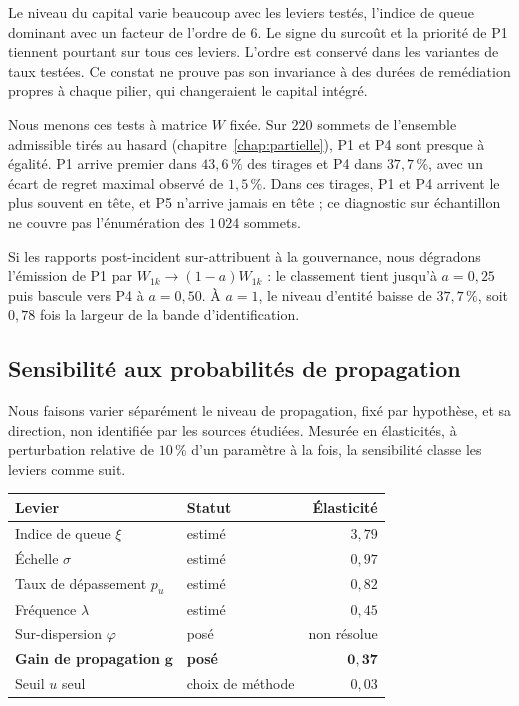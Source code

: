 Le niveau du capital varie beaucoup avec les leviers testés, l'indice de queue dominant avec
un facteur de l'ordre de $6$. Le signe du surcoût et la priorité de P1 tiennent pourtant sur tous
ces leviers. L'ordre est conservé dans les variantes de taux testées. Ce constat ne prouve pas son invariance
à des durées de remédiation propres à chaque pilier, qui changeraient le capital intégré.

Nous menons ces tests à matrice $W$ fixée. Sur $220$ sommets de l'ensemble admissible tirés au
hasard (chapitre~\ref{chap:partielle}), P1 et P4 sont presque à égalité. P1 arrive premier dans
$43{,}6\,\%$ des tirages et P4 dans $37{,}7\,\%$, avec un écart de regret maximal observé de
$1{,}5\,\%$. Dans ces tirages, P1 et P4 arrivent le plus souvent en tête, et P5 n'arrive jamais en tête ;
ce diagnostic sur échantillon ne couvre pas l'énumération des $1\,024$ sommets.

Si les rapports post-incident sur-attribuent à la gouvernance, nous
dégradons l'émission de P1 par $W_{1k}\to(1-a)W_{1k}$ : le classement tient jusqu'à $a=0{,}25$
puis bascule vers P4 à $a=0{,}50$. À $a=1$, le niveau d'entité baisse de $37{,}7\,\%$, soit
$0{,}78$ fois la largeur de la bande d'identification.

\subsection{Sensibilité aux probabilités de propagation}
\label{sec:sensibilite-propagation}

Nous faisons varier séparément le niveau de propagation, fixé par hypothèse, et sa direction,
non identifiée par les sources étudiées. Mesurée en élasticités, à perturbation relative de $10\,\%$ d'un paramètre
à la fois, la sensibilité classe les leviers comme suit.

\begin{center}\footnotesize
\renewcommand{\arraystretch}{1.15}
\begin{tabular}{@{}l l r@{}}
\toprule
\textbf{Levier} & \textbf{Statut} & \textbf{Élasticité} \\
\midrule
Indice de queue $\xi$ & estimé & $3{,}79$ \\
Échelle $\sigma$ & estimé & $0{,}97$ \\
Taux de dépassement $p_u$ & estimé & $0{,}82$ \\
Fréquence $\lambda$ & estimé & $0{,}45$ \\
Sur-dispersion $\varphi$ & posé & non résolue \\
\textbf{Gain de propagation} $\boldsymbol{g}$ & \textbf{posé} & $\mathbf{0{,}37}$ \\
Seuil $u$ seul & choix de méthode & $0{,}03$ \\
\bottomrule
\end{tabular}
\end{center}

